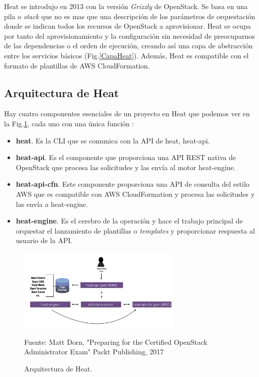 Heat se introdujo en 2013 con la versión \textit{Grizzly} de OpenStack. Se basa en una pila o \textit{stack} que no es mas que una descripción de los parámetros de orquestación donde se indican todos los recursos de OpenStack a aprovisionar. Heat se ocupa por tanto del aprovisionamiento y la configuración sin necesidad de preocuparnos de las dependencias o el orden de ejecución, creando así una capa de abstracción entre los servicios básicos (Fig.\ref{CapaHeat}). Además, Heat es compatible con  el formato de plantillas de AWS CloudFormation.


\subsection{Arquitectura de Heat}
Hay cuatro componentes esenciales de un proyecto en Heat que podemos ver en la Fig.\ref{heat_architecture}, cada uno con una única función \cite{dorn_heat_2017}:
\begin{itemize}
\item \textbf{heat}. Es la CLI que se comunica con la API de heat, heat-api.
\item \textbf{heat-api}. Es el componente que proporciona una API REST nativa de OpenStack que procesa las solicitudes y las envía al motor heat-engine.
\item \textbf{heat-api-cfn}. Este componente proporciona una API de consulta del estilo AWS que es compatible con AWS CloudFormation y procesa las solicitudes y las envía a heat-engine.
\item \textbf{heat-engine}. Es el cerebro de la operación y hace el trabajo principal de orquestar el lanzamiento de plantillas o \textit{templates} y proporcionar respuesta al usuario de la API.
\end{itemize}

\begin{figure}
    \centering
    \includegraphics[width=0.7\textwidth]{imagenes/capitulo4/heat_architecture.png}
    \caption{Arquitectura de Heat.}
	\vspace{0.3cm}
    \footnotesize{Fuente: Matt Dorn, "Preparing for the Certified OpenStack Administrator Exam" Packt Publishing, 2017 }
    \label{heat_architecture}
\end{figure}


